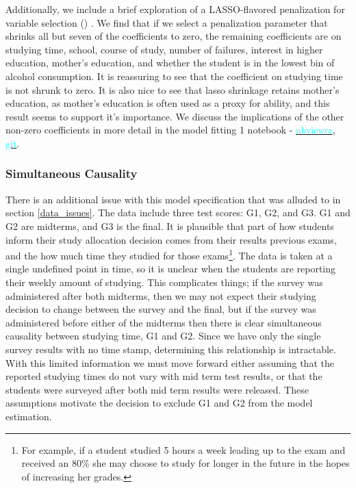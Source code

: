 \documentclass[12pt]{article}
\begin{document}
Additionally, we include a brief exploration of a LASSO-flavored penalization for variable selection (\cite{MLmetrics}) . We find that if we select a penalization parameter that shrinks all but seven of the coefficients to zero, the remaining coefficients are on studying time, school, course of study, number of failures, interest in higher education, mother's education, and whether the student is in the lowest bin of alcohol consumption. It is reassuring to see that the coefficient on studying time is not shrunk to zero. It is also nice to see that lasso shrinkage retains mother's education, as mother's education is often used as a proxy for ability, and this result seems to support it's importance. We discuss the implications of the other non-zero coefficients in more detail in the model fitting 1 notebook - \href{https://nbviewer.jupyter.org/github/nadavtadelis/Reproducible_Metrics/blob/master/model_fitting_1.ipynb}{\textcolor{cyan}{nbviewer}}, \href{https://github.com/nadavtadelis/Reproducible_Metrics/blob/master/model_fitting_1.ipynb}{\textcolor{cyan}{git}}.

\subsubsection{Simultaneous Causality} \label{simul_caus}
There is an additional issue with this model specification that was alluded to in section \ref{data_issues}. The data include three test scores: G1, G2, and G3. G1 and G2 are midterms, and G3 is the final. It is plausible that part of how students inform their study allocation decision comes from their results previous exams, and the how much time they studied for those exams\footnote{For example, if a student studied 5 hours a week leading up to the exam and received an 80\% she may choose to study for longer in the future in the hopes of increasing her grades.}. The data is taken at a single undefined point in time, so it is unclear when the students are reporting their weekly amount of studying. This complicates things; if the survey was administered after both midterms, then we may not expect their studying decision to change between the survey and the final, but if the survey was administered before either of the midterms then there is clear simultaneous causality between studying time, G1 and G2. Since we have only the single survey results with no time stamp, determining this relationship is intractable. With this limited information we must move forward either assuming that the reported studying times do not vary with mid term test results, or that the students were surveyed after both mid term results were released. These assumptions motivate the decision to exclude G1 and G2 from the model estimation.
\end{document}
